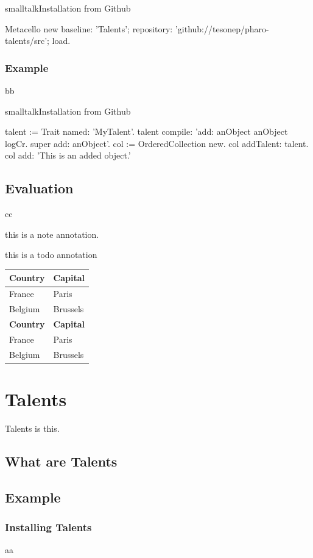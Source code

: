 \documentclass[10pt,twoside,english]{_support/latex/sbabook/sbabook}
\begin{document}
\begin{listing}[float, label=install]{smalltalk}{Installation from Github}

Metacello new
  baseline: 'Talents';
  repository: 'github://tesonep/pharo-talents/src';
  load.
\end{listing}
\subsection{Example}
bb

\begin{listing}[float, label=talent-example]{smalltalk}{Installation from Github}

talent := Trait named: 'MyTalent'.
talent compile: 'add: anObject
anObject logCr.
super add: anObject'.
col := OrderedCollection new.
col addTalent: talent.
col add: 'This is an added object.'
\end{listing}
\section{Evaluation}
cc

\begin{note}
this is a note annotation.
\end{note}

\begin{todo}
this is a todo annotation
\end{todo}

\begin{tabular}{ll}
\toprule
\textbf{Country} & \textbf{Capital} \\
\midrule
France & Paris \\
Belgium & Brussels \\
\textbf{Country} & \textbf{Capital} \\
\midrule
France & Paris \\
Belgium & Brussels \\
\bottomrule
\end{tabular}
\chapter{Talents}
Talents is this.
\section{What are Talents}\section{Example}\subsection{Installing Talents}
aa
\end{document}
